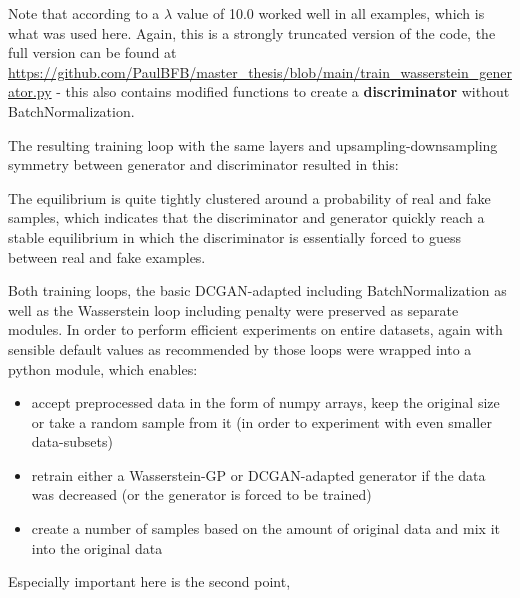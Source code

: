 Note that according to \cite{gulrajani2017improved} a $\lambda$ value of 10.0 worked well in all examples, which is what was used here. Again, this is a strongly truncated version of the code, the full version can be found at \url{https://github.com/PaulBFB/master_thesis/blob/main/train_wasserstein_generator.py} - this also contains modified functions to create a \textbf{discriminator} without BatchNormalization.

The resulting training loop with the same layers and upsampling-downsampling symmetry between generator and discriminator resulted in this:


The equilibrium is quite tightly clustered around a probability of real and fake samples, which indicates that the discriminator and generator quickly reach a stable equilibrium 
in which the discriminator is essentially forced to guess between real and fake examples.

Both training loops, the basic DCGAN-adapted including BatchNormalization as well as the Wasserstein loop including penalty were preserved as separate modules. 
In order to perform efficient experiments on entire datasets, again with sensible default values as recommended by \cite{buitinck2013api} those loops were wrapped into a python module, which enables:

\begin{itemize}
	\item accept preprocessed data in the form of numpy arrays, keep the original size or take a random sample from it (in order to experiment with even smaller data-subsets)
	\item retrain either a Wasserstein-GP or DCGAN-adapted generator if the data was decreased (or the generator is forced to be trained)
	\item create a number of samples based on the amount of original data and mix it into the original data
\end{itemize}

Especially important here is the second point, 
